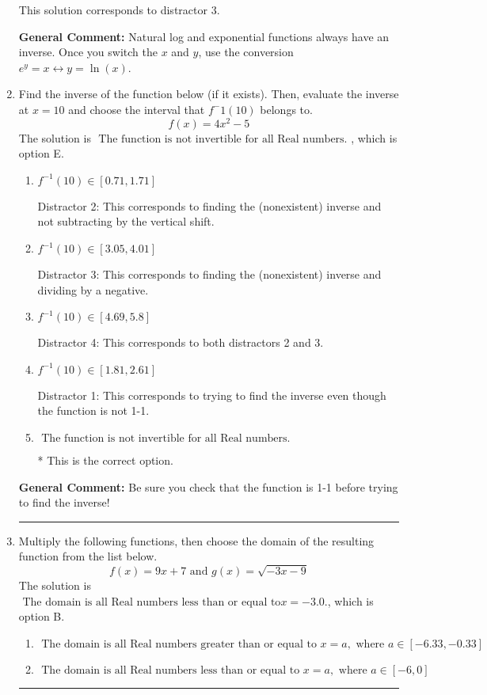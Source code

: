 \documentclass{extbook}[14pt]
\newcommand{\litem}[1]{\item #1

\rule{\textwidth}{0.4pt}}
\begin{document}
\begin{enumerate}
{\begin{enumerate}[label=\Alph*.]
 This solution corresponds to distractor 3.
\end{enumerate}

\textbf{General Comment:} Natural log and exponential functions always have an inverse. Once you switch the $x$ and $y$, use the conversion $ e^y = x \leftrightarrow y=\ln(x)$.
}
\litem{
Find the inverse of the function below (if it exists). Then, evaluate the inverse at $x = 10$ and choose the interval that $f^-1(10)$ belongs to.
\[ f(x) = 4 x^2 - 5 \]The solution is \( \text{ The function is not invertible for all Real numbers. } \), which is option E.\begin{enumerate}[label=\Alph*.]
\item \( f^{-1}(10) \in [0.71, 1.71] \)

 Distractor 2: This corresponds to finding the (nonexistent) inverse and not subtracting by the vertical shift.
\item \( f^{-1}(10) \in [3.05, 4.01] \)

 Distractor 3: This corresponds to finding the (nonexistent) inverse and dividing by a negative.
\item \( f^{-1}(10) \in [4.69, 5.8] \)

 Distractor 4: This corresponds to both distractors 2 and 3.
\item \( f^{-1}(10) \in [1.81, 2.61] \)

 Distractor 1: This corresponds to trying to find the inverse even though the function is not 1-1. 
\item \( \text{ The function is not invertible for all Real numbers. } \)

* This is the correct option.
\end{enumerate}

\textbf{General Comment:} Be sure you check that the function is 1-1 before trying to find the inverse!
}
\litem{
Multiply the following functions, then choose the domain of the resulting function from the list below.
\[ f(x) = 9x + 7 \text{ and } g(x) = \sqrt{-3x-9}  \]The solution is \( \text{ The domain is all Real numbers less than or equal to} x = -3.0. \), which is option B.\begin{enumerate}[label=\Alph*.]
\item \( \text{ The domain is all Real numbers greater than or equal to } x = a, \text{ where } a \in [-6.33, -0.33] \)


\item \( \text{ The domain is all Real numbers less than or equal to } x = a, \text{ where } a \in [-6, 0] \)



\end{enumerate}}
\end{enumerate}
\end{document}
